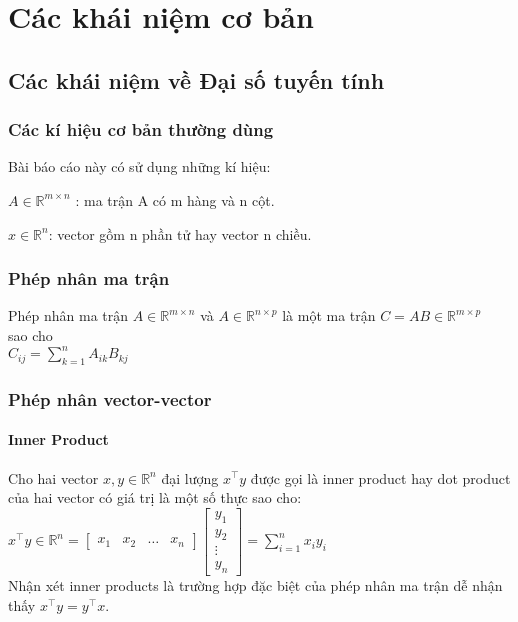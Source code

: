 \chapter{Các khái niệm cơ bản}
\section{Các khái niệm về Đại số tuyến tính}
\subsection{Các kí hiệu cơ bản thường dùng}
Bài báo cáo này có sử dụng những kí hiệu:

$A \in \mathbb{R}^{m\times n}$	: ma trận A có m hàng và n cột.

$x \in \mathbb{R}^n$: vector gồm n phần tử hay vector n chiều.

\subsection{Phép nhân ma trận}
Phép nhân ma trận $A \in \mathbb{R}^{m\times n}$ và $A \in \mathbb{R} ^{n\times p}$ là một ma trận 
$C=AB \in \mathbb{R} ^{m\times p}$ \\sao cho \\
$C_{ij} = \sum_{k=1}^{n}A_{ik}B_{kj}$

\subsection{Phép nhân vector-vector}
\subsubsection{Inner Product}
Cho hai vector $x,y\in \mathbb{R}^n$ đại lượng $x^\top y$ được gọi là inner product hay dot product của hai vector có giá trị là một số thực sao cho:\\

$x^\top y \in \mathbb{R} ^{n} =
\left[\begin{matrix}x_1 & x_2 & \dots & x_n\end{matrix}\right]
\left[\begin{matrix}
y_1 \\
y_2 \\
\vdots\\
y_n
\end{matrix}\right]
=  \sum_{i=1}^{n}x_{i}y_{i}$\\
Nhận xét inner products là trường hợp đặc biệt của phép nhân ma trận dễ nhận thấy $x^\top y = y^\top x$.

